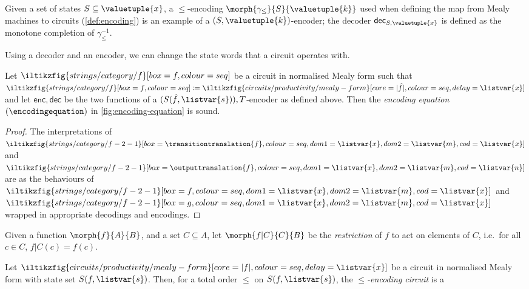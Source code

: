 \begin{example}
    Given a set of states \(S \subseteq \valuetuple{x}\), a \(\leq\)-encoding
    \(\morph{\gamma_\leq}{S}{\valuetuple{k}}\) used when defining the map from
    Mealy machines to circuits (\cref{def:encoding}) is an example of a
    \((S,\valuetuple{k})\)-encoder; the decoder
    \(\mathsf{dec}_{S,\valuetuple{x}}\) is defined as the monotone completion
    of \(\gamma_\leq^{-1}\).
\end{example}

Using a decoder and an encoder, we can change the state words that a circuit
operates with.

\begin{proposition}\label{prop:encoding-equation}
    Let \(\iltikzfig{strings/category/f}[box=f,colour=seq]\) be a circuit in
    normalised Mealy form such that \(
    \iltikzfig{strings/category/f}[box=f,colour=seq]
    \coloneqq
    \iltikzfig{circuits/productivity/mealy-form}[core=|\hat{f}|,colour=seq,delay=\listvar{x}]
    \) and let \(\mathsf{enc},\mathsf{dec}\) be the two functions of a
    \((S(\hat{f},\listvar{s})),T\)-encoder as defined above.
    Then the \emph{encoding equation} \((\encodingequation)\) in
    \cref{fig:encoding-equation} is sound.
\end{proposition}
\begin{proof}
    The interpretations of \(
    \iltikzfig{strings/category/f-2-1}[box={\transitiontranslation{f}},colour=seq,dom1=\listvar{x},dom2=\listvar{m},cod=\listvar{x}]
    \) and \(
    \iltikzfig{strings/category/f-2-1}[box={\outputtranslation{f}},colour=seq,dom1=\listvar{x},dom2=\listvar{m},cod=\listvar{n}]
    \) are as the behaviours of \(
    \iltikzfig{strings/category/f-2-1}[box={f},colour=seq,dom1=\listvar{x},dom2=\listvar{m},cod=\listvar{x}]
    \) and \(
    \iltikzfig{strings/category/f-2-1}[box={g},colour=seq,dom1=\listvar{x},dom2=\listvar{m},cod=\listvar{x}]
    \) wrapped in appropriate decodings and encodings.
\end{proof}

\begin{notation}[Restriction]
    Given a function \(\morph{f}{A}{B}\), and a set
    \(C \subseteq A\), let \(\morph{f|C}{C}{B}\) be the \emph{restriction} of
    \(f\) to act on elements of \(C\), i.e.\ for all \(c \in C\),
    \(f|C(c) = f(c)\).
\end{notation}

\begin{definition}
    Let \(
    \iltikzfig{circuits/productivity/mealy-form}[core=|f|,colour=seq,delay=\listvar{x}]
    \) be a circuit in normalised Mealy form with state set \(S(f, \listvar{s})\).
    Then, for a total order \(\leq\) on \(S(f, \listvar{s})\), the
    \emph{\(\leq\)-encoding circuit} is a
\end{definition}

